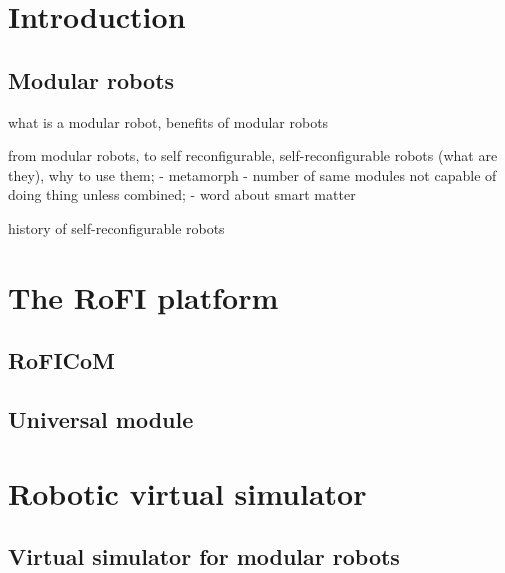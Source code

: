 \documentclass[
  digital, %
  table,   %
  oneside, %
  nolof,     %
  nolot,     %
]{fithesis3}
\begin{document}
\chapter{Introduction}

\section{Modular robots}


what is a modular robot, benefits of modular robots

from modular robots, to self reconfigurable,
self-reconfigurable robots (what are they), why to use them;
- metamorph - number of same modules not capable of doing thing unless combined;
- word about smart matter

history of self-reconfigurable robots




\chapter{The RoFI platform}




\section{RoFICoM}
\label{roficom}

\section{Universal module}
\label{univ-module}


\chapter{Robotic virtual simulator}

\section{Virtual simulator for modular robots}
\end{document}
